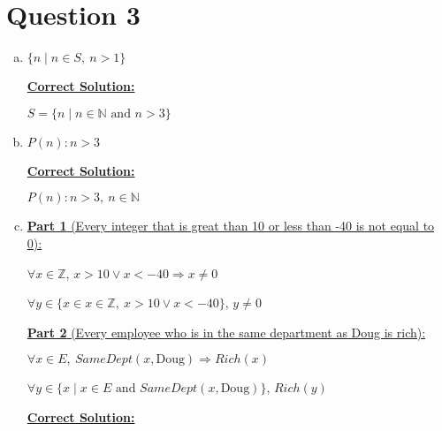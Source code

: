 \documentclass[12pt]{article}
\begin{document}
\section*{Question 3}
\begin{enumerate}[a.]
    \item

    $\{n \mid n \in S,\:n > 1\}$

    \begin{mdframed}
        \underline{\textbf{Correct Solution:}}

        \bigskip

        \color{red}$S = \{n \mid n \in \mathbb{N} \text{ and } n > 3\}$\color{black}

    \end{mdframed}

    \item

    $P(n): n > 3$

    \begin{mdframed}
        \underline{\textbf{Correct Solution:}}

        \bigskip

        \color{red}$P(n): n > 3,\:n \in \mathbb{N}$\color{black}

    \end{mdframed}

    \item

    \underline{\textbf{Part 1} (Every integer that is great than 10 or less than -40 is not equal to 0):}

    \bigskip

    $\forall x \in \mathbb{Z}$, $x > 10 \lor x < -40 \Rightarrow x \neq 0$

    $\forall y \in \{x \in x \in \mathbb{Z},\: x > 10 \lor x < -40\}$, $y \neq 0$

    \bigskip

    \underline{\textbf{Part 2} (Every employee who is in the same department as Doug is rich):}

    \bigskip

    $\forall x \in E,\:SameDept(x, \text{Doug}) \Rightarrow Rich(x)$

    $\forall y \in \{x \mid x \in E \text{ and } SameDept(x,\text{Doug})\}$, $Rich(y)$

    \bigskip

    \begin{mdframed}
        \underline{\textbf{Correct Solution:}}


\end{mdframed}
\end{enumerate}
\end{document}
